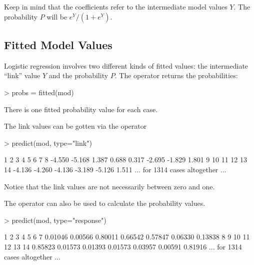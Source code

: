 Keep in mind that the coefficients refer to the intermediate model
values $Y$.  The probability $P$ will be $e^Y / (1 + e^Y )$.


\subsection{Fitted Model Values}


Logistic regression involves two different kinds of fitted values:
the intermediate ``link'' value $Y$ and the probability $P$.  The
 operator returns the probabilities:
\begin{Schunk}
\begin{Sinput}
> probs = fitted(mod) 
\end{Sinput}
\end{Schunk}
There is one fitted probability value for each case.

The link values can be gotten via the  operator
\begin{Schunk}
\begin{Sinput}
> predict(mod, type="link")
\end{Sinput}
\end{Schunk}
\begin{Schunk}
\begin{Soutput}
     1      2      3      4      5      6      7      8 
-4.550 -5.168  1.387  0.688  0.317 -2.695 -1.829  1.801 
     9     10     11     12     13     14 
-4.136 -4.260 -4.136 -3.189 -5.126  1.511 
... for 1314 cases altogether ...
\end{Soutput}
\end{Schunk}

Notice that the link values are not necessarily between zero and one.

The  operator can also be used to calculate the
probability values.
\begin{Schunk}
\begin{Sinput}
> predict(mod, type="response")
\end{Sinput}
\end{Schunk}
\begin{Schunk}
\begin{Soutput}
      1       2       3       4       5       6       7 
0.01046 0.00566 0.80011 0.66542 0.57847 0.06330 0.13838 
      8       9      10      11      12      13      14 
0.85823 0.01573 0.01393 0.01573 0.03957 0.00591 0.81916 
... for 1314 cases altogether ...
\end{Soutput}
\end{Schunk}
 
